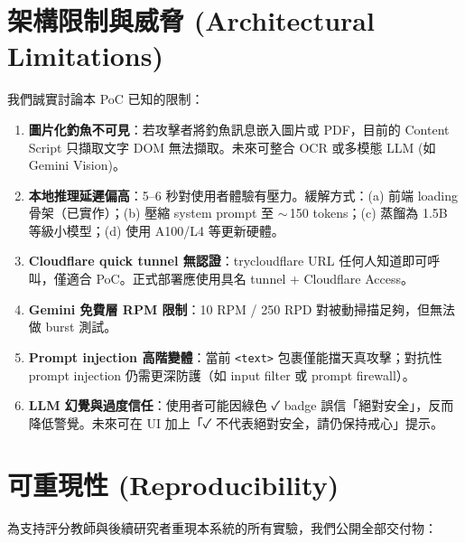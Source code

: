 \documentclass[11pt, a4paper]{article}
\begin{document}
\section{架構限制與威脅 (Architectural Limitations)}\label{sec:limitations}

我們誠實討論本 PoC 已知的限制：

\begin{enumerate}[leftmargin=2em]
  \item \textbf{圖片化釣魚不可見}：若攻擊者將釣魚訊息嵌入圖片或 PDF，目前的 Content Script 只擷取文字 DOM 無法擷取。未來可整合 OCR 或多模態 LLM (如 Gemini Vision)。
  \item \textbf{本地推理延遲偏高}：5--6 秒對使用者體驗有壓力。緩解方式：(a) 前端 loading 骨架（已實作）；(b) 壓縮 system prompt 至 $\sim$\,150 tokens；(c) 蒸餾為 1.5B 等級小模型；(d) 使用 A100/L4 等更新硬體。
  \item \textbf{Cloudflare quick tunnel 無認證}：trycloudflare URL 任何人知道即可呼叫，僅適合 PoC。正式部署應使用具名 tunnel + Cloudflare Access。
  \item \textbf{Gemini 免費層 RPM 限制}：10 RPM / 250 RPD 對被動掃描足夠，但無法做 burst 測試。
  \item \textbf{Prompt injection 高階變體}：當前 \texttt{<text>} 包裹僅能擋天真攻擊；對抗性 prompt injection 仍需更深防護（如 input filter 或 prompt firewall）\cite{liu2024promptinjection}。
  \item \textbf{LLM 幻覺與過度信任}：使用者可能因綠色 ✓ badge 誤信「絕對安全」，反而降低警覺。未來可在 UI 加上「✓ 不代表絕對安全，請仍保持戒心」提示。
\end{enumerate}

\section{可重現性 (Reproducibility)}\label{sec:repro}

為支持評分教師與後續研究者重現本系統的所有實驗，我們公開全部交付物：
\end{document}
